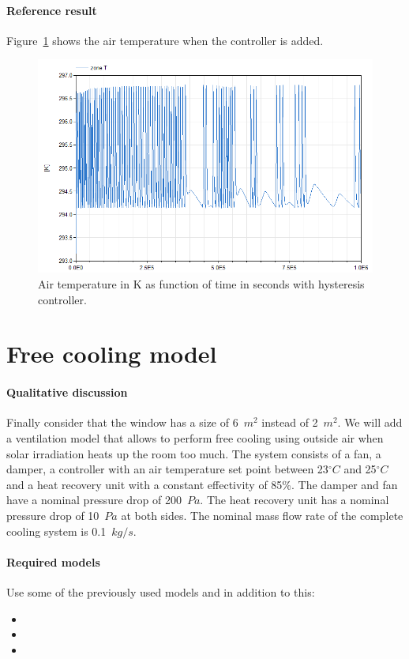 \documentclass[10pt,a4paper]{article}
\begin{document}
\paragraph{Reference result}
Figure~\ref{fig:res5} shows the air temperature when
the controller is added.



\begin{figure}
\centering
\includegraphics[scale=0.6]{result5.png}
\caption{Air temperature in K as function of time in seconds with hysteresis controller.}
\label{fig:res5}
\end{figure}


\section{Free cooling model}
\paragraph{Qualitative discussion}
Finally consider that the window has a size of
6~$m^2$ instead of 2~$m^2$.
We will add a ventilation model that allows to
perform free cooling using outside air when
solar irradiation heats up the room too much.
The system consists of a fan,
a damper,
a controller with an air temperature 
set point between 23$^{\circ}C$ and 25$^{\circ}C$
and a heat recovery unit with a constant effectivity of 85\%.
The damper and fan have a nominal pressure drop of 200~$Pa$. The heat recovery unit has a nominal pressure drop of 10~$Pa$ at both sides.
The nominal mass flow rate of the complete cooling system is 0.1~$kg/s$.


\paragraph{Required models}
Use some of the previously used models and in addition to this:
\begin{itemize}
\item {}
\item {}
\item {}
\end{itemize}
\end{document}

